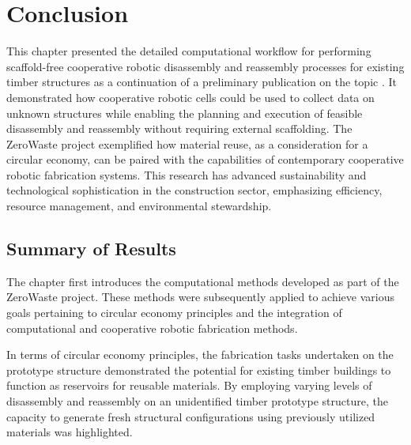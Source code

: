 \section{Conclusion} \label{sec:6_conclusion}
    This chapter presented the detailed computational workflow for performing scaffold-free cooperative robotic disassembly and reassembly processes for existing timber structures as a continuation of a preliminary publication on the topic \cite{bruun_zerowaste_2022}. It demonstrated how cooperative robotic cells could be used to collect data on unknown structures while enabling the planning and execution of feasible disassembly and reassembly without requiring external scaffolding. The ZeroWaste project exemplified how material reuse, as a consideration for a circular economy, can be paired with the capabilities of contemporary cooperative robotic fabrication systems. This research has advanced sustainability and technological sophistication in the construction sector, emphasizing efficiency, resource management, and environmental stewardship.

\subsection{Summary of Results}
    The chapter first introduces the computational methods developed as part of the ZeroWaste project. These methods were subsequently applied to achieve various goals pertaining to circular economy principles and the integration of computational and cooperative robotic fabrication methods.
    
    In terms of circular economy principles, the fabrication tasks undertaken on the prototype structure demonstrated the potential for existing timber buildings to function as reservoirs for reusable materials. By employing varying levels of disassembly and reassembly on an unidentified timber prototype structure, the capacity to generate fresh structural configurations using previously utilized materials was highlighted.
    
